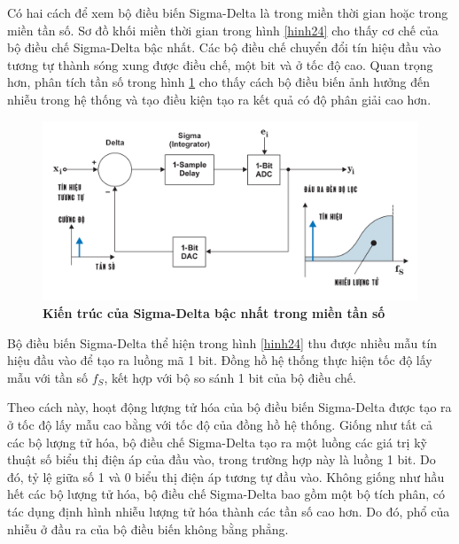 Có hai cách để xem bộ điều biến Sigma-Delta là trong miền thời gian hoặc trong miền tần số. Sơ đồ khối miền thời gian trong hình \ref{hinh24} cho thấy cơ chế của bộ điều chế Sigma-Delta bậc nhất. Các bộ điều chế chuyển đổi tín hiệu đầu vào tương tự thành sóng xung được điều chế, một bit và ở tốc độ cao. Quan trọng hơn, phân tích tần số trong hình \ref{hinh25} cho thấy cách bộ điều biến ảnh hưởng đến nhiễu trong hệ thống và tạo điều kiện tạo ra kết quả có độ phân giải cao hơn.
\begin{figure}
    \centering
    \includegraphics[width=13cm]{Images/Chuong2/kientruc_1st_pho.png}
    \caption[Kiến trúc của Sigma-Delta bậc nhất trong miền tần số]{\bfseries \fontsize{12pt}{0pt}\selectfont Kiến trúc của Sigma-Delta bậc nhất trong miền tần số}
    \label{hinh25}
\end{figure}

Bộ điều biến Sigma-Delta thể hiện trong hình \ref{hinh24} thu được nhiều mẫu tín hiệu đầu vào để tạo ra luồng mã 1 bit. Đồng hồ hệ thống thực hiện tốc độ lấy mẫu với tần số $f_S$, kết hợp với bộ so sánh 1 bit của bộ điều chế.

Theo cách này, hoạt động lượng tử hóa của bộ điều biến Sigma-Delta được tạo ra ở tốc độ lấy mẫu cao bằng với tốc độ của đồng hồ hệ thống. Giống như tất cả các bộ lượng tử hóa, bộ điều chế Sigma-Delta tạo ra một luồng các giá trị kỹ thuật số biểu thị điện áp 
của đầu vào, trong trường hợp này là luồng 1 bit. Do đó, tỷ lệ giữa số 1 và 0 biểu thị điện áp tương tự đầu vào. Không giống như hầu hết các bộ lượng tử hóa, bộ điều chế Sigma-Delta bao gồm một bộ tích phân, có tác dụng định hình nhiễu lượng tử hóa thành các tần số cao hơn. Do đó, phổ của nhiễu ở đầu ra của bộ điều biến không bằng phẳng.

